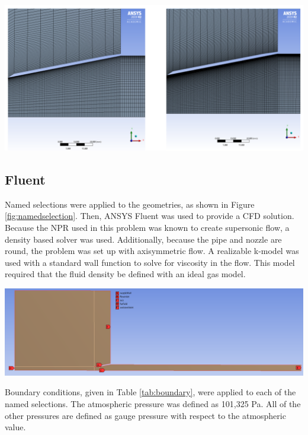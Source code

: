 \documentclass[12pt]{article} %
\begin{document}
\begin{center}
    \includegraphics[width = \linewidth]{GridCompareA.png}
    \label{fig:gridcompareA}
\end{center}

\clearpage

\subsection{Fluent}\label{section:fluent}
Named selections were applied to the geometries, as shown in Figure \ref{fig:namedselection}. Then, ANSYS Fluent was used to provide a CFD solution. Because the NPR used in this problem was known to create supersonic flow, a density based solver was used. Additionally, because the pipe and nozzle are round, the problem was set up with axisymmetric flow. A realizable k-\textepsilon\:model was used with a standard wall function to solve for viscosity in the flow. This model required that the fluid density be defined with an ideal gas model.

\begin{center}
    \includegraphics[width = \linewidth]{Named_Selections.PNG}
    \label{fig:namedselection}
\end{center}

Boundary conditions, given in Table \ref{tab:boundary}, were applied to each of the named selections. The atmospheric pressure was defined as 101,325 Pa. All of the other pressures are defined as gauge pressure with respect to the atmospheric value.
\end{document}
